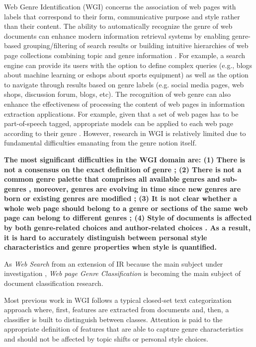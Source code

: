 Web Genre Identification (WGI) concerns the association of web pages with labels that correspond to their form, communicative purpose and style rather than their content. The ability to automatically recognize the genre of web documents can enhance modern information retrieval systems by enabling genre-based grouping/filtering of search results or building intuitive hierarchies of web page collections combining topic and genre information \parencite{Braslavski2007,Rosso2008,de2009genre}. For example, a search engine can provide its users with the option to define complex queries (e.g., blogs about machine learning or eshops about sports equipment) as well as the option to navigate through results based on genre labels (e.g. social media pages, web shops, discussion forum, blogs, etc). The recognition of web genre can also enhance the effectiveness of processing the content of web pages in information extraction applications. For example, given that a set of web pages has to be part-of-speech tagged, appropriate models can be applied to each web page according to their genre \parencite{Nooralahzadeh2014}. However, research in WGI is relatively limited due to fundamental difficulties emanating from the genre notion itself.

\textbf{The most significant difficulties in the WGI domain are: (1) There is not a consensus on the exact definition of genre \parencite{crowston2011problems}; (2) There is not a common genre  palette that comprises all available genres and sub-genres \parencite{santini2011cross,mehler2010genres_on_web,mason2009n,sharoff2010web}, moreover, genres are evolving in time since new  genres are born or existing genres are modified \parencite{Boese2005}; (3) It is not clear whether a whole web page should belong to a genre or sections of the same web page can belong to  different genres \parencite{jebari2015combination,madjarov2015web}; (4) Style of documents is affected by both genre-related choices and author-related choices \parencite{petrenz2011stable,Sharroff2010}. As a result, it is hard to accurately distinguish between personal style characteristics and genre properties when style is quantified.}

As \textit{Web Search} from an extension of IR because the main subject under investigation \parencite{manning2008introduction}, \textit{Web page Genre Classification } is becoming the main subject of document classification research.

Most previous work in WGI follows a typical closed-set text categorization approach where, first, features are extracted from documents and, then, a classifier is built to distinguish between classes. Attention is paid to the appropriate definition of features that are able to capture genre characteristics and should not be affected by topic shifts or personal style choices. 

